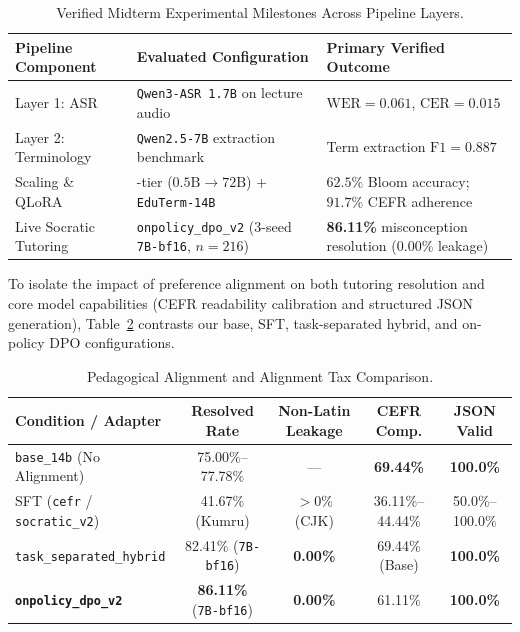 \documentclass[a4paper,12pt]{report}
\begin{document}
\begin{table}[htbp]
\centering
\small
\caption{Verified Midterm Experimental Milestones Across Pipeline Layers.}
\label{tab:midterm_summary}
\scriptsize\setlength{\tabcolsep}{4pt}
\begin{tabularx}{\textwidth}{>{\RaggedRight\arraybackslash}l >{\RaggedRight\arraybackslash}X >{\RaggedRight\arraybackslash}X}
\toprule
\textbf{Pipeline Component} & \textbf{Evaluated Configuration} & \textbf{Primary Verified Outcome} \\
\midrule
Layer 1: ASR & \texttt{Qwen3-ASR 1.7B} on lecture audio & $\text{WER} = 0.061$, $\text{CER} = 0.015$ \\
Layer 2: Terminology & \texttt{Qwen2.5-7B} extraction benchmark & Term extraction $\text{F1} = 0.887$ \\
Scaling \& QLoRA & 7-tier ($0.5\text{B} \to 72\text{B}$) + \texttt{EduTerm-14B} & $62.5\%$ Bloom accuracy; $91.7\%$ CEFR adherence \\
Live Socratic Tutoring & \texttt{onpolicy\_dpo\_v2} (3-seed \texttt{7B-bf16}, $n=216$) & \textbf{86.11\%} misconception resolution ($0.00\%$ leakage) \\
\bottomrule
\end{tabularx}
\end{table}

To isolate the impact of preference alignment on both tutoring resolution and core model capabilities (CEFR readability calibration and structured JSON generation), Table~\ref{tab:midterm_alignment} contrasts our base, SFT, task-separated hybrid, and on-policy DPO configurations.

\begin{table}[htbp]
\centering
\small
\caption{Pedagogical Alignment and Alignment Tax Comparison.}
\label{tab:midterm_alignment}
\scriptsize\setlength{\tabcolsep}{3.5pt}
\begin{tabularx}{\textwidth}{>{\RaggedRight\arraybackslash}Xcccc}
\toprule
\textbf{Condition / Adapter} & \textbf{Resolved Rate} & \textbf{Non-Latin Leakage} & \textbf{CEFR Comp.} & \textbf{JSON Valid} \\
\midrule
\texttt{base\_14b} (No Alignment) & 75.00\%--77.78\% & --- & \textbf{69.44\%} & \textbf{100.0\%} \\
SFT (\texttt{cefr} / \texttt{socratic\_v2}) & 41.67\% (Kumru) & $>0\%$ (CJK) & 36.11\%--44.44\% & 50.0\%--100.0\% \\
\texttt{task\_separated\_hybrid} & 82.41\% (\texttt{7B-bf16}) & \textbf{0.00\%} & 69.44\% (Base) & \textbf{100.0\%} \\
\textbf{\texttt{onpolicy\_dpo\_v2}} & \textbf{86.11\%} (\texttt{7B-bf16}) & \textbf{0.00\%} & 61.11\% & \textbf{100.0\%} \\
\bottomrule
\end{tabularx}
\end{table}
\end{document}
